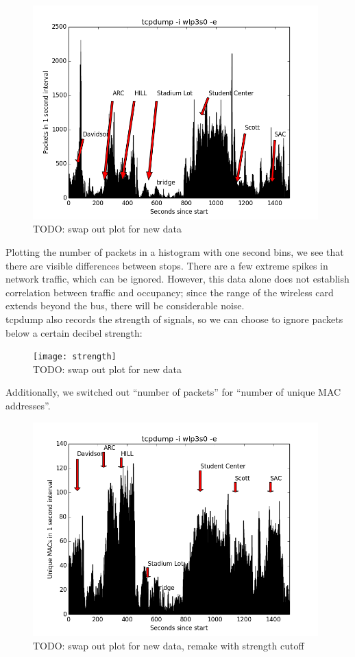 \documentclass[letterpaper,abstract=on,titlepage=false]{scrreprt}
\begin{document}
	\begin{figure}[H]
	\includegraphics[width=11cm]{packets}
	\\TODO: swap out plot for new data
	\centering
	\end{figure}

	Plotting the number of packets in a histogram with one second bins, we see that there are visible differences between stops.
	There are a few extreme spikes in network traffic, which can be ignored.
	However, this data alone does not establish correlation between traffic and occupancy; since the range of the wireless card extends beyond the bus, there will be considerable noise.
	\\
	tcpdump also records the strength of signals, so we can choose to ignore packets below a certain decibel strength:

	\begin{figure}[H]
	\texttt{[image: strength]}
	\\TODO: swap out plot for new data
	\centering
	\end{figure}

	Additionally, we switched out ``number of packets'' for ``number of unique MAC addresses''.

	\begin{figure}[H]
	\includegraphics[width=11cm]{unique}
	\\TODO: swap out plot for new data, remake with strength cutoff
	\centering
	\end{figure}
\end{document}
